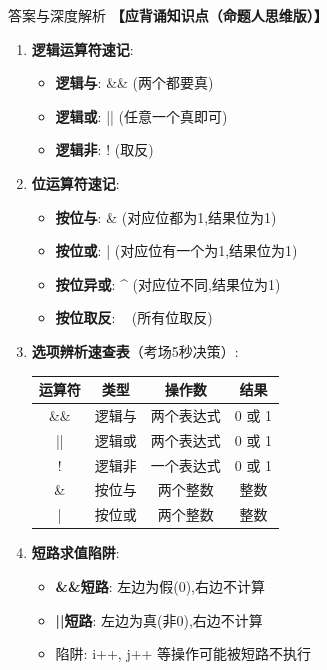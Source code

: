 \documentclass[a4paper,12pt]{article}
\begin{document}
\begin{bluebox}{答案与深度解析}
	\textbf{【应背诵知识点（命题人思维版）】}
	\begin{enumerate}[leftmargin=*, nosep]
		\item \textbf{逻辑运算符速记}:
		      \begin{itemize}
			      \item \textbf{逻辑与}: \&\& (两个都要真)
			      \item \textbf{逻辑或}: || (任意一个真即可)
			      \item \textbf{逻辑非}: ! (取反)
		      \end{itemize}

		\item \textbf{位运算符速记}:
		      \begin{itemize}
			      \item \textbf{按位与}: \& (对应位都为1,结果位为1)
			      \item \textbf{按位或}: | (对应位有一个为1,结果位为1)
			      \item \textbf{按位异或}: \^{} (对应位不同,结果位为1)
			      \item \textbf{按位取反}: ~ (所有位取反)
		      \end{itemize}

		\item \textbf{选项辨析速查表}（考场5秒决策）:
		      \begin{tabular}{|c|c|c|c|}
			      \hline
			      \textbf{运算符} & \textbf{类型} & \textbf{操作数} & \textbf{结果} \\
			      \hline
			      \&\&         & 逻辑与         & 两个表达式        & 0 或 1       \\
			      \hline
			      ||           & 逻辑或         & 两个表达式        & 0 或 1       \\
			      \hline
			      !            & 逻辑非         & 一个表达式        & 0 或 1       \\
			      \hline
			      \&           & 按位与         & 两个整数         & 整数          \\
			      \hline
			      |            & 按位或         & 两个整数         & 整数          \\
			      \hline
		      \end{tabular}

		\item \textbf{短路求值陷阱}:
		      \begin{itemize}
			      \item \textbf{\&\&短路}: 左边为假(0),右边不计算
			      \item \textbf{||短路}: 左边为真(非0),右边不计算
			      \item 陷阱: i++, j++ 等操作可能被短路不执行
		      \end{itemize}
	\end{enumerate}


\end{bluebox}
\end{document}
